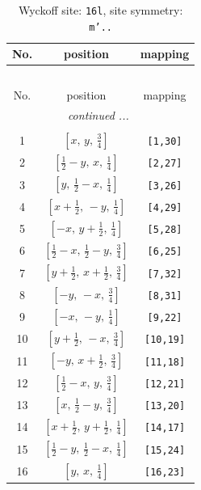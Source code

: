 \documentclass[fleqn,8pt]{jsarticle}
\begin{document}
\renewcommand{\arraystretch}{1.2}
\begin{longtable}{ccc}
\caption{Wyckoff site: {\tt 16l}, site symmetry: {\tt m'..}}
 \\
 \hline \hline
No. & position & mapping \\ \hline \endfirsthead

\multicolumn{2}{l}{\tablename\ \thetable{}} \\
 \hline \hline
No. & position & mapping \\ \hline \endhead

 \hline \hline
\multicolumn{2}{r}{\footnotesize\it continued ...} \\ \endfoot

 \hline \hline
\multicolumn{2}{r}{} \\ \endlastfoot

1 & $\left[ x,\, y,\, \frac{3}{4} \right]$ & {\tt [1,30]} \\ \hline
2 & $\left[ \frac{1}{2} - y,\, x,\, \frac{1}{4} \right]$ & {\tt [2,27]} \\ \hline
3 & $\left[ y,\, \frac{1}{2} - x,\, \frac{1}{4} \right]$ & {\tt [3,26]} \\ \hline
4 & $\left[ x + \frac{1}{2},\, - y,\, \frac{1}{4} \right]$ & {\tt [4,29]} \\ \hline
5 & $\left[ - x,\, y + \frac{1}{2},\, \frac{1}{4} \right]$ & {\tt [5,28]} \\ \hline
6 & $\left[ \frac{1}{2} - x,\, \frac{1}{2} - y,\, \frac{3}{4} \right]$ & {\tt [6,25]} \\ \hline
7 & $\left[ y + \frac{1}{2},\, x + \frac{1}{2},\, \frac{3}{4} \right]$ & {\tt [7,32]} \\ \hline
8 & $\left[ - y,\, - x,\, \frac{3}{4} \right]$ & {\tt [8,31]} \\ \hline
9 & $\left[ - x,\, - y,\, \frac{1}{4} \right]$ & {\tt [9,22]} \\ \hline
10 & $\left[ y + \frac{1}{2},\, - x,\, \frac{3}{4} \right]$ & {\tt [10,19]} \\ \hline
11 & $\left[ - y,\, x + \frac{1}{2},\, \frac{3}{4} \right]$ & {\tt [11,18]} \\ \hline
12 & $\left[ \frac{1}{2} - x,\, y,\, \frac{3}{4} \right]$ & {\tt [12,21]} \\ \hline
13 & $\left[ x,\, \frac{1}{2} - y,\, \frac{3}{4} \right]$ & {\tt [13,20]} \\ \hline
14 & $\left[ x + \frac{1}{2},\, y + \frac{1}{2},\, \frac{1}{4} \right]$ & {\tt [14,17]} \\ \hline
15 & $\left[ \frac{1}{2} - y,\, \frac{1}{2} - x,\, \frac{1}{4} \right]$ & {\tt [15,24]} \\ \hline
16 & $\left[ y,\, x,\, \frac{1}{4} \right]$ & {\tt [16,23]} \\
\end{longtable}
\end{document}
